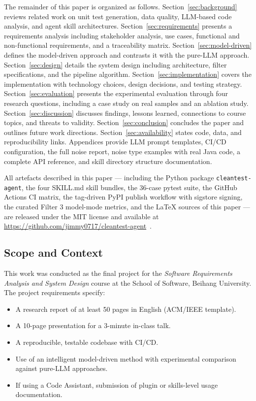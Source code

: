 \documentclass[acmlarge,nonacm,screen]{acmart}
\begin{document}
The remainder of this paper is organized as follows. Section~\ref{sec:background} reviews related work on unit test generation, data quality, LLM-based code analysis, and agent skill architectures. Section~\ref{sec:requirements} presents a requirements analysis including stakeholder analysis, use cases, functional and non-functional requirements, and a traceability matrix. Section~\ref{sec:model-driven} defines the model-driven approach and contrasts it with the pure-LLM approach. Section~\ref{sec:design} details the system design including architecture, filter specifications, and the pipeline algorithm. Section~\ref{sec:implementation} covers the implementation with technology choices, design decisions, and testing strategy. Section~\ref{sec:evaluation} presents the experimental evaluation through four research questions, including a case study on real samples and an ablation study. Section~\ref{sec:discussion} discusses findings, lessons learned, connections to course topics, and threats to validity. Section~\ref{sec:conclusion} concludes the paper and outlines future work directions. Section~\ref{sec:availability} states code, data, and reproducibility links. Appendices provide LLM prompt templates, CI/CD configuration, the full noise report, noise type examples with real Java code, a complete API reference, and skill directory structure documentation.

All artefacts described in this paper --- including the
Python package \texttt{cleantest-agent}, the four SKILL.md skill
bundles, the 36-case pytest suite, the GitHub Actions CI matrix, the
tag-driven PyPI publish workflow with sigstore signing, the curated
Filter 3 model-mode metrics, and the LaTeX sources of this paper
---  are released under the MIT license and available at
\url{https://github.com/jimmy0717/cleantest-agent}~\cite{yang2026cleantestagent}.

\subsection{Scope and Context}

This work was conducted as the final project for the \textit{Software Requirements Analysis and System Design} course at the School of Software, Beihang University. The project requirements specify:
\begin{itemize}
    \item A research report of at least 50 pages in English (ACM/IEEE template).
    \item A 10-page presentation for a 3-minute in-class talk.
    \item A reproducible, testable codebase with CI/CD.
    \item Use of an intelligent model-driven method with experimental comparison against pure-LLM approaches.
    \item If using a Code Assistant, submission of plugin or skills-level usage documentation.
\end{itemize}
\end{document}
